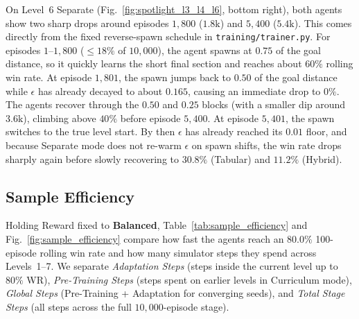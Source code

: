 On Level~6 Separate (Fig.~\ref{fig:spotlight_l3_l4_l6}, bottom right), both agents show two sharp drops around episodes $1{,}800$ ($1.8\text{k}$) and $5{,}400$ ($5.4\text{k}$). This comes directly from the fixed reverse-spawn schedule in \texttt{training/trainer.py}. For episodes $1$--$1{,}800$ ($\le 18\%$ of $10{,}000$), the agent spawns at $0.75$ of the goal distance, so it quickly learns the short final section and reaches about $60\%$ rolling win rate. At episode $1{,}801$, the spawn jumps back to $0.50$ of the goal distance while $\epsilon$ has already decayed to about $0.165$, causing an immediate drop to $0\%$. The agents recover through the $0.50$ and $0.25$ blocks (with a smaller dip around $3.6\text{k}$), climbing above $40\%$ before episode $5{,}400$. At episode $5{,}401$, the spawn switches to the true level start. By then $\epsilon$ has already reached its $0.01$ floor, and because Separate mode does not re-warm $\epsilon$ on spawn shifts, the win rate drops sharply again before slowly recovering to $30.8\%$ (Tabular) and $11.2\%$ (Hybrid).

\subsection{Sample Efficiency}
\label{subsec:sample_efficiency}

Holding Reward fixed to \textbf{Balanced}, Table~\ref{tab:sample_efficiency} and Fig.~\ref{fig:sample_efficiency} compare how fast the agents reach an $80.0\%$ 100-episode rolling win rate and how many simulator steps they spend across Levels~1--7. We separate \textit{Adaptation Steps} (steps inside the current level up to $80\%$ WR), \textit{Pre-Training Steps} (steps spent on earlier levels in Curriculum mode), \textit{Global Steps} (Pre-Training + Adaptation for converging seeds), and \textit{Total Stage Steps} (all steps across the full $10{,}000$-episode stage).


